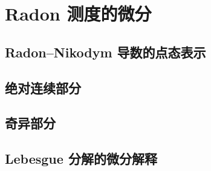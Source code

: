 \section{Radon 测度的微分}
\label{b1:sec:1403}


\subsection{Radon–Nikodym 导数的点态表示}
\label{b1:subsec:140301}

\subsection{绝对连续部分}
\label{b1:subsec:140302}

\subsection{奇异部分}
\label{b1:subsec:140303}

\subsection{Lebesgue 分解的微分解释}
\label{b1:subsec:140304}


